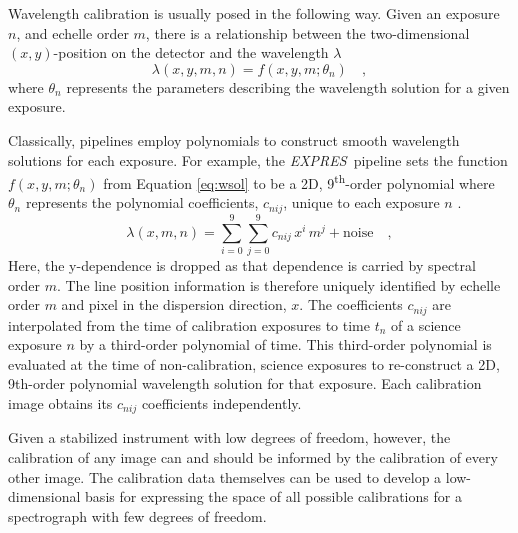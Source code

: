 \documentclass[modern]{aastex63}
\newcommand{\project}[1]{\textsl{#1}}
\newcommand{\acronym}[1]{{\small{#1}}}
\newcommand{\expres}{\project{\acronym{EXPRES}}}
\begin{document}
Wavelength calibration is usually posed in the following way.  Given an exposure $n$, and echelle order $m$, there is a relationship between
the two-dimensional $(x,y)$-position on the detector and the
wavelength $\lambda$
\begin{equation}
\lambda(x,y,m,n) = f(x,y,m;\theta_{n})
\quad ,
\label{eq:wsol}
\end{equation}
where $\theta_{n}$ represents the parameters describing the wavelength solution for a given exposure.

Classically, pipelines employ polynomials to construct smooth wavelength solutions for each exposure.  For example, the \expres\ pipeline sets the function $f(x,y,m;\theta_{n})$ from Equation \ref{eq:wsol} to be a 2D, 9\textsuperscript{th}-order polynomial where $\theta_{n}$ represents the polynomial coefficients, $c_{nij}$, unique to each exposure $n$ \citep{petersburg2020}.
\begin{equation}
\lambda(x,m,n) = \sum_{i=0}^9\sum_{j=0}^9 c_{nij}\, x^i\,m^j + \mathrm{noise}
\quad ,
\label{eq:poly_wsol}
\end{equation}
Here, the y-dependence is dropped as that dependence is carried by spectral order $m$.  The line position information is therefore uniquely identified by echelle order $m$ and pixel in the dispersion direction, $x$.  The coefficients $c_{nij}$ are interpolated from the time of calibration exposures to time $t_n$ of a science exposure $n$ by a third-order polynomial of time.  This third-order polynomial is evaluated at the time of non-calibration, science exposures to re-construct a 2D, 9th-order polynomial wavelength solution for that exposure.  Each calibration image obtains its $c_{nij}$ coefficients independently.

Given a stabilized instrument with low degrees of freedom, however,  the calibration of any image can and should be informed by the calibration of every other image.  The calibration data themselves can be used to develop a low-dimensional basis for expressing the space of all possible calibrations for a spectrograph with few degrees of freedom.
\end{document}
